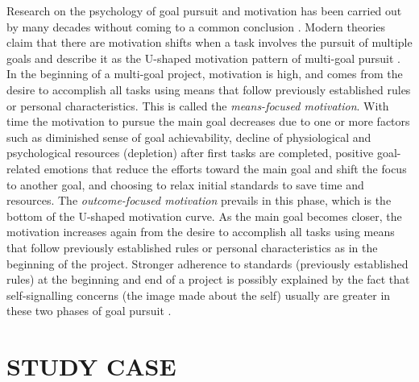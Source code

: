 Research on the psychology of goal pursuit and motivation has been carried out by many decades without coming 
to a common conclusion \cite{Toure-TilleryEtAl2011a, Hull1932}. Modern theories claim that there are motivation
shifts when a task involves the pursuit of multiple goals and describe it as the U-shaped motivation pattern of 
multi-goal
pursuit \cite{BonezziEtAl2011, Toure-TilleryEtAl2011a}. In the beginning of a multi-goal project, motivation 
is high, and comes from the desire to accomplish all tasks using means that follow previously established 
rules 
or personal characteristics. This is called the \emph{means-focused motivation}. With time the motivation to 
pursue the main goal decreases due to one or more factors such as diminished sense of goal achievability, 
decline 
of physiological and psychological resources (depletion) after first tasks are completed, positive 
goal-related emotions that reduce the efforts toward the main goal and shift the focus to another goal, and 
choosing to relax initial standards to save time and resources. The \emph{outcome-focused motivation} prevails 
in this phase, which is the bottom of the U-shaped motivation curve. As the main goal 
becomes closer, the motivation increases again from the desire to accomplish all tasks using means that follow 
previously established rules or personal characteristics as in the beginning of the project. Stronger 
adherence 
to standards (previously established rules) at the beginning and end of a project is possibly explained by the 
fact that self-signalling concerns (the image made about the self) usually are greater in these two phases of 
goal pursuit \cite{Toure-TilleryEtAl2011}.

\section{STUDY CASE}

